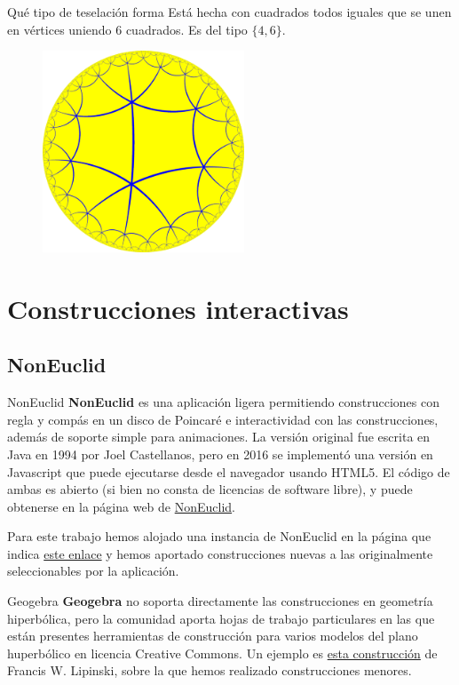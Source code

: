 \documentclass[compress]{beamer}
\begin{document}
\begin{frame}{Qué tipo de teselación forma}
  Está hecha con cuadrados todos iguales que se unen en
  vértices uniendo $6$ cuadrados. Es del tipo $\{4,6\}$.
  
  \begin{figure}[ht!]
    \centering
    \includegraphics[width=60mm]{./tiling-4-6.png}
  \end{figure}
\end{frame}


\section{Construcciones interactivas}
\subsection{NonEuclid}
\begin{frame}{NonEuclid}
\textbf{NonEuclid} es una aplicación ligera permitiendo construcciones
con regla y compás en un disco de Poincaré e interactividad con las
construcciones, además de soporte simple para animaciones. La versión
original fue escrita en Java en 1994 por Joel Castellanos, pero en
2016 se implementó una versión en Javascript que puede ejecutarse
desde el navegador usando HTML5. El código de ambas es abierto (si
bien no consta de licencias de software libre), y puede obtenerse en
la página web de
\href{https://www.cs.unm.edu/~joel/NonEuclid/NonEuclid.html}{NonEuclid}.

Para este trabajo hemos alojado una instancia de NonEuclid en la
página que indica \href{https://m42.github.io/hiperboloide/}{este
  enlace} y hemos aportado construcciones nuevas a las originalmente
seleccionables por la aplicación.
\end{frame}

\begin{frame}{Geogebra}
\textbf{Geogebra} no soporta directamente las construcciones en geometría
hiperbólica, pero la comunidad aporta hojas de trabajo particulares en las
que están presentes herramientas de construcción para varios modelos del
plano huperbólico en licencia Creative Commons. Un ejemplo es
\href{https://www.geogebra.org/material/show/id/2028857}{esta construcción}
de Francis W. Lipinski, sobre la que hemos realizado construcciones menores.
\end{frame}
\end{document}
